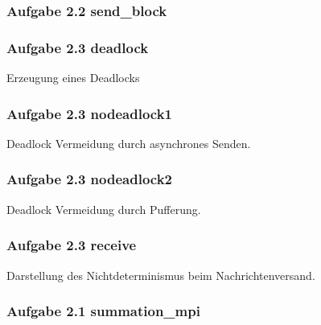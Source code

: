 \documentclass[a4paper,
12pt,
BCOR12mm,
]{scrartcl}
\begin{document}
\subsubsection*{Aufgabe 2.2 send\_block}


\newpage
\subsubsection*{Aufgabe 2.3 deadlock}
Erzeugung eines Deadlocks


\newpage
\subsubsection*{Aufgabe 2.3 nodeadlock1}
Deadlock Vermeidung durch asynchrones Senden.


\newpage
\subsubsection*{Aufgabe 2.3 nodeadlock2}
Deadlock Vermeidung durch Pufferung.


\newpage
\subsubsection*{Aufgabe 2.3 receive}
Darstellung des Nichtdeterminismus beim Nachrichtenversand. 


\newpage
\subsubsection*{Aufgabe 2.1 summation\_mpi}

\end{document}
